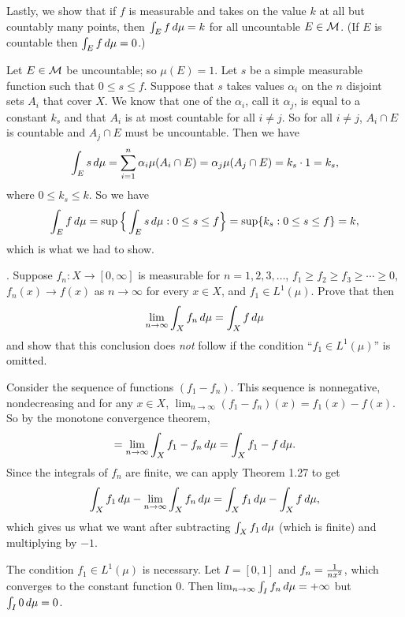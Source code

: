 Lastly, we show that if $f$ is measurable and takes on the value $k$ at all but countably many points, then $\int_E f\,d\mu = k$ for all uncountable $E\in {\cal M}$. (If $E$ is countable then $\int_E f\,d\mu = 0$.)

\proof Let $E\in {\cal M}$ be uncountable; so $\mu(E) = 1$. Let $s$ be a simple measurable function such that $0\leq s\leq f$. Suppose that $s$ takes values $\alpha_i$ on the $n$ disjoint sets $A_i$ that cover $X$. We know that one of the $\alpha_i$, call it $\alpha_j$, is equal to a constant $k_s$ and that $A_i$ is at most countable for all $i \neq j$. So for all $i \neq j$, $A_i \cap E$ is countable and $A_j \cap E$ must be uncountable. Then we have
$$\int_E s\,d\mu = \sum_{i=1}^n \alpha_i \mu(A_i\cap E) = \alpha_j\mu(A_j\cap E) = k_s\cdot 1 = k_s,$$
where $0\leq k_s \leq k$. So we have
$$\int_E f\,d\mu = \sup \Big\{ \int_E s\,d\mu : 0 \leq s\leq f\Big\} = \sup \{k_s : 0\leq s \leq f\} = k,$$
which is what we had to show.\slug

. Suppose $f_n : X\rightarrow[0,\infty]$ is measurable for $n=1,2,3,\ldots$, $f_1\geq f_2\geq f_3\geq\cdots\geq 0$, $f_n(x)\rightarrow f(x)$ as $n\rightarrow\infty$ for every $x\in X$, and $f_1\in L^1(\mu)$. Prove that then
$$\lim_{n\rightarrow\infty} \int_X f_n \,d\mu = \int_X f\,d\mu$$
and show that this conclusion does {\it not} follow if the condition ``$f_1\in L^1(\mu)$'' is omitted.

\proof Consider the sequence of functions $(f_1 - f_n)$. This sequence is nonnegative, nondecreasing and for any $x\in X$, $\lim_{n\rightarrow\infty} (f_1 - f_n)(x) = f_1(x) - f(x)$. So by the monotone convergence theorem,
$$= \lim_{n\rightarrow \infty} \int_X f_1 - f_n \,d\mu = \int_X f_1 - f\,d\mu.$$
Since the integrals of $f_n$ are finite, we can apply Theorem 1.27 to get
$$\int_X f_1\,d\mu - \lim_{n\rightarrow \infty}\int_X f_n \,d\mu = \int_X f_1\,d\mu -  \int_X f \,d\mu,$$
which gives us what we want after subtracting $\int_X f_1 \,d\mu$ (which is finite) and multiplying by $-1$.\slug

The condition $f_1\in L^1(\mu)$ is necessary. Let $I = [0,1]$ and $f_n = {1\over nx^2}$, which converges to the constant function 0. Then $\lim_{n\rightarrow \infty} \int_I f_n \,d\mu = +\infty$ but $\int_I 0\,d\mu = 0$.

\bye
